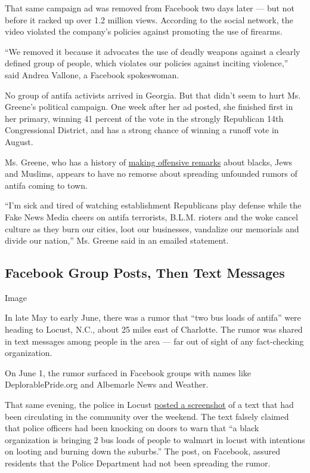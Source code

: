 That same campaign ad was removed from Facebook two days later --- but
not before it racked up over 1.2 million views. According to the social
network, the video violated the company's policies against promoting the
use of firearms.

``We removed it because it advocates the use of deadly weapons against a
clearly defined group of people, which violates our policies against
inciting violence,'' said Andrea Vallone, a Facebook spokeswoman.

No group of antifa activists arrived in Georgia. But that didn't seem to
hurt Ms. Greene's political campaign. One week after her ad posted, she
finished first in her primary, winning 41 percent of the vote in the
strongly Republican 14th Congressional District, and has a strong chance
of winning a runoff vote in August.

Ms. Greene, who has a history of
\href{https://www.nytimes.com/2020/06/17/us/marjorie-taylor-greene-georgia.html}{making
offensive remarks} about blacks, Jews and Muslims, appears to have no
remorse about spreading unfounded rumors of antifa coming to town.

``I'm sick and tired of watching establishment Republicans play defense
while the Fake News Media cheers on antifa terrorists, B.L.M. rioters
and the woke cancel culture as they burn our cities, loot our
businesses, vandalize our memorials and divide our nation,'' Ms. Greene
said in an emailed statement.

\hypertarget{facebook-group-posts-then-text-messages}{%
\subsection{Facebook Group Posts, Then Text
Messages}\label{facebook-group-posts-then-text-messages}}

Image

In late May to early June, there was a rumor that ``two bus loads of
antifa'' were heading to Locust, N.C., about 25 miles east of Charlotte.
The rumor was shared in text messages among people in the area --- far
out of sight of any fact-checking organization.

On June 1, the rumor surfaced in Facebook groups with names like
DeplorablePride.org and Albemarle News and Weather.

That same evening, the police in Locust
\href{https://www.facebook.com/971105932951713/photos/a.1627165354012431/3050055735056712/?type=3\&__xts__\%5B0\%5D=68.ARA_CCbgmvw1vn-Rpj-uzp23zApNlmhYrmV7kAtkCrWO5lfHA5skNnUYW2fj_5wf6r8kxnpw_dwH0ucrGRhE-2HEtaM9AyVNqOLSMcNBInwixXXKwUdH2idPkUXkBB1zLlC-XbjjgGtx0GcK98L5LviWf207V-RyJDtJoCrK_mr6p2b1n-xKWBX0d-3DeX4fw3mbnXtcq1l_EixqJKZ-fp0Ellypj2SkkfshKk53Qu6G81p6t1sn9WMXz9tYxCvp7RxCHyK9rt5gTs7UQVRw3SdA0ijGo-roueC8w7bWpwFYl88ZINOTTmfR0H5HrEWgqF5pUJZOtraFuQOlZPf0KK6tTw\&__tn__=-R}{posted
a screenshot} of a text that had been circulating in the community over
the weekend. The text falsely claimed that police officers had been
knocking on doors to warn that ``a black organization is bringing 2 bus
loads of people to walmart in locust with intentions on looting and
burning down the suburbs.'' The post, on Facebook, assured residents
that the Police Department had not been spreading the rumor.

